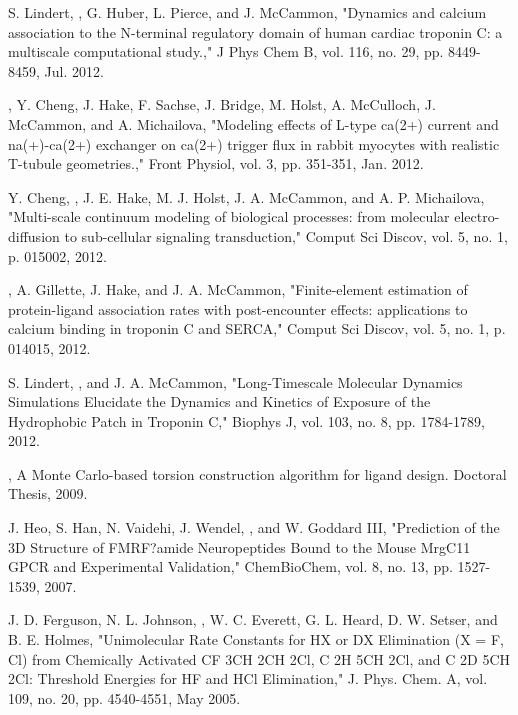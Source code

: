\begin{etaremune}
\item S. Lindert, \pmkh, G. Huber, L. Pierce, and J. McCammon, "Dynamics and calcium association to the N-terminal regulatory domain of human cardiac troponin C: a multiscale computational study.," J Phys Chem B, vol. 116, no. 29, pp. 8449-8459, Jul. 2012.
\item \pmkh, Y. Cheng, J. Hake, F. Sachse, J. Bridge, M. Holst, A. McCulloch, J. McCammon, and A. Michailova, "Modeling effects of L-type ca(2+) current and na(+)-ca(2+) exchanger on ca(2+) trigger flux in rabbit myocytes with realistic T-tubule geometries.," Front Physiol, vol. 3, pp. 351-351, Jan. 2012.
\item Y. Cheng, \pmkh, J. E. Hake, M. J. Holst, J. A. McCammon, and A. P. Michailova, "Multi-scale continuum modeling of biological processes: from molecular electro-diffusion to sub-cellular signaling transduction," Comput Sci Discov, vol. 5, no. 1, p. 015002, 2012.
\item \pmkh, A. Gillette, J. Hake, and J. A. McCammon, "Finite-element estimation of protein-ligand association rates with post-encounter effects: applications to calcium binding in troponin C and SERCA," Comput Sci Discov, vol. 5, no. 1, p. 014015, 2012.
\item S. Lindert, \pmkh, and J. A. McCammon, "Long-Timescale Molecular Dynamics Simulations Elucidate the Dynamics and Kinetics of Exposure of the Hydrophobic Patch in Troponin C," Biophys J, vol. 103, no. 8, pp. 1784-1789, 2012. 
\item \pmkh, A Monte Carlo-based torsion construction algorithm for ligand design. Doctoral Thesis, 2009. 
\item J. Heo, S. Han, N. Vaidehi, J. Wendel, \pmkh, and W. Goddard III, "Prediction of the 3D Structure of FMRF?amide Neuropeptides Bound to the Mouse MrgC11 GPCR and Experimental Validation," ChemBioChem, vol. 8, no. 13, pp. 1527-1539, 2007.
\item J. D. Ferguson, N. L. Johnson, \pmkh, W. C. Everett, G. L. Heard, D. W. Setser, and B. E. Holmes, "Unimolecular Rate Constants for HX or DX Elimination (X = F, Cl) from Chemically Activated CF 3CH 2CH 2Cl, C 2H 5CH 2Cl, and C 2D 5CH 2Cl:  Threshold Energies for HF and HCl Elimination," J. Phys. Chem. A, vol. 109, no. 20, pp. 4540-4551, May 2005.

\end{etaremune}

